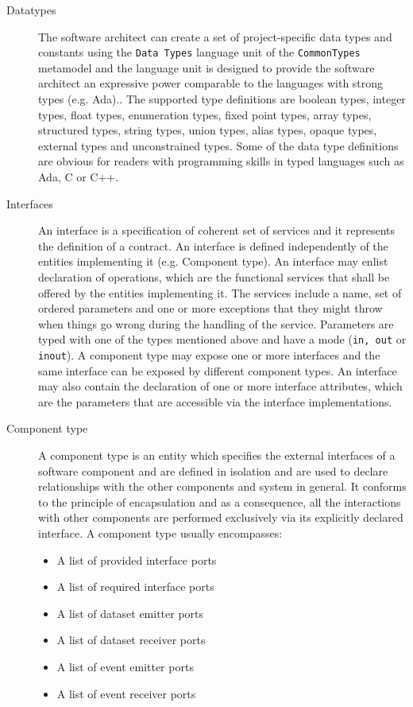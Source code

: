 \begin{description}
\item [Datatypes] The software architect can create a set of project-specific data types and constants using the \texttt{Data Types} language unit of the \texttt{CommonTypes} metamodel and the language unit is designed to provide the software architect an expressive power comparable to the languages with strong types (e.g. Ada).\cite{SpecMetamodel}. The supported type definitions are boolean types, integer types, float types, enumeration types, fixed point types, array types, structured types, string types, union types, alias types, opaque types, external types and unconstrained types. Some of the data type definitions are obvious for readers with programming skills in typed languages such as Ada, C or C++. 

\item [Interfaces] An interface is a specification of coherent set of services and it represents the definition of a contract. An interface is defined independently of the entities implementing it (e.g. Component type). An interface may enlist declaration of operations, which are the functional services that shall be offered by the entities implementing it. The services include a name, set of ordered parameters and one or more exceptions that they might throw when things go wrong during the handling of the service. Parameters are typed with one of the types mentioned above and have a mode (\texttt{in, out} or \texttt{inout}). A component type may expose one or more interfaces and the same interface can be exposed by different component types. An interface may also contain the declaration of one or more interface attributes, which are the parameters that are accessible via the interface implementations.

\item [Component type] A component type is an entity which specifies the external interfaces of a software component and are defined in isolation and are used to declare relationships with the other components and system in general. It conforms to the principle of encapsulation and as a consequence, all the interactions with other components are performed exclusively via its explicitly declared interface. A component type usually encompasses:
\begin{itemize}
\item A list of provided interface ports
\item A list of required interface ports
\item A list of dataset emitter ports 
\item A list of dataset receiver ports
\item A list of event emitter ports
\item A list of event receiver ports 
\end{itemize}


\end{description}
